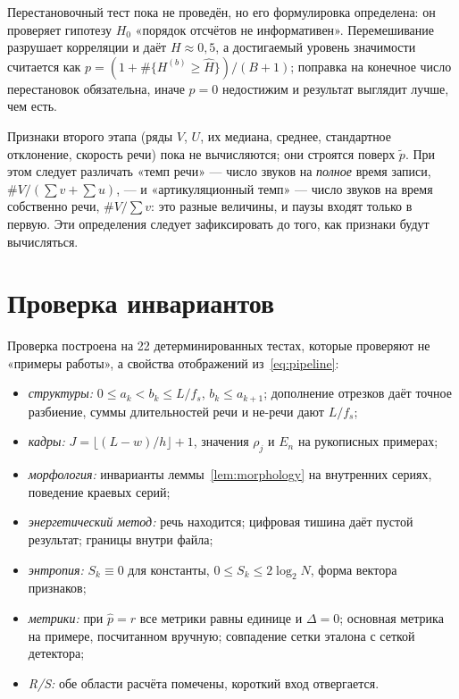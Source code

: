 \documentclass[11pt,a4paper]{article}
\theoremstyle{definition}
\theoremstyle{plain}
\begin{document}
Перестановочный тест пока не проведён, но его формулировка определена: он
проверяет гипотезу $H_0$ «порядок отсчётов не информативен». Перемешивание
разрушает корреляции и даёт $H\approx0{,}5$, а достигаемый уровень значимости
считается как $p=(1+\#\{H^{(b)}\ge\hat H\})/(B+1)$; поправка на конечное число
перестановок обязательна, иначе $p=0$ недостижим и результат выглядит лучше,
чем есть.

Признаки второго этапа (ряды $V$, $U$, их медиана, среднее, стандартное
отклонение, скорость речи) пока не вычисляются; они строятся поверх
$\tilde p$. При этом следует различать «темп речи» --- число звуков на
\emph{полное} время записи, $\#V/(\sum v+\sum u)$, --- и «артикуляционный
темп» --- число звуков на время собственно речи, $\#V/\sum v$: это разные
величины, и паузы входят только в первую. Эти определения следует зафиксировать
до того, как признаки будут вычисляться.

\section{Проверка инвариантов}

Проверка построена на 22 детерминированных тестах, которые проверяют не
«примеры работы», а свойства отображений из~\eqref{eq:pipeline}:

\begin{itemize}[leftmargin=1.4em]
  \item \emph{структуры:} $0\le a_k<b_k\le L/f_s$, $b_k\le a_{k+1}$;
        дополнение отрезков даёт точное разбиение, суммы длительностей
        речи и не-речи дают $L/f_s$;
  \item \emph{кадры:} $J=\lfloor(L-w)/h\rfloor+1$, значения $\rho_j$ и $E_n$
        на рукописных примерах;
  \item \emph{морфология:} инварианты леммы~\ref{lem:morphology} на внутренних
        сериях, поведение краевых серий;
  \item \emph{энергетический метод:} речь находится; цифровая тишина даёт
        пустой результат; границы внутри файла;
  \item \emph{энтропия:} $S_k\equiv0$ для константы, $0\le S_k\le2\log_2N$,
        форма вектора признаков;
  \item \emph{метрики:} при $\hat p=r$ все метрики равны единице и $\Delta=0$;
        основная метрика на примере, посчитанном вручную;
        совпадение сетки эталона с сеткой детектора;
  \item \emph{R/S:} обе области расчёта помечены, короткий вход отвергается.
\end{itemize}
\end{document}
